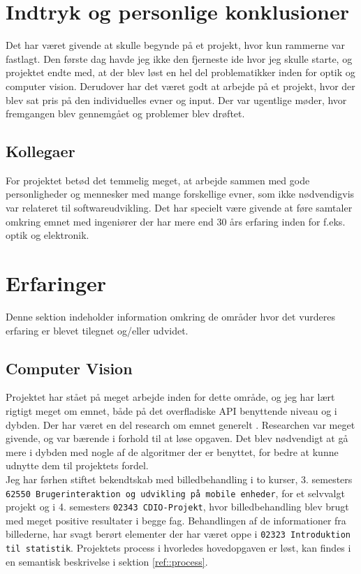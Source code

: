 \section{Indtryk og personlige konklusioner}
Det har været givende at skulle begynde på et projekt, hvor kun rammerne var fastlagt. Den første dag havde jeg ikke den fjerneste ide hvor jeg skulle starte, og projektet endte med, at der blev løst en hel del problematikker inden for optik og computer vision. Derudover har det været godt at arbejde på et projekt, hvor der blev sat pris på den individuelles evner og input. Der var ugentlige møder, hvor fremgangen blev gennemgået og problemer blev drøftet. 

\subsection{Kollegaer}
For projektet betød det temmelig meget, at arbejde sammen med gode personligheder og mennesker med mange forskellige evner, som ikke nødvendigvis var relateret til softwareudvikling. Det har specielt være givende at føre samtaler omkring emnet med ingeniører der har mere end 30 års erfaring inden for f.eks. optik og elektronik.

\section{Erfaringer}
Denne sektion indeholder information omkring de områder hvor det vurderes erfaring er blevet tilegnet og/eller udvidet.

\subsection{Computer Vision}
Projektet har stået på meget arbejde inden for dette område, og jeg har lært rigtigt meget om emnet, både på det overfladiske API benyttende niveau og i dybden. Der har været en del research om emnet generelt . Researchen var meget givende, og var bærende i forhold til at løse opgaven.
Det blev nødvendigt at gå mere i dybden med nogle af de algoritmer der er benyttet, for bedre at kunne udnytte dem til projektets fordel.\\
Jeg har førhen stiftet bekendtskab med billedbehandling i to kurser, 3. semesters\\ \texttt{62550 Brugerinteraktion og udvikling på mobile enheder}, for et selvvalgt projekt og i 4. semesters \texttt{02343 CDIO-Projekt}, hvor billedbehandling blev brugt med meget positive resultater i begge fag.
Behandlingen af de informationer fra billederne, har svagt berørt elementer der har været oppe i \texttt{02323 Introduktion til statistik}.
Projektets process i hvorledes hovedopgaven er løst, kan findes i en semantisk beskrivelse i sektion \ref{ref::process}.


